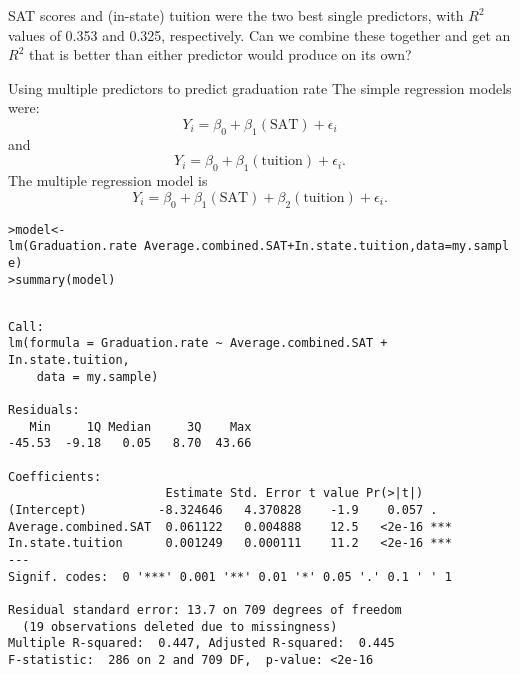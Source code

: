 \documentclass{beamer}\usepackage[]{graphicx}\usepackage[]{color}
\makeatletter
\newcommand{\hlopt}[1]{\textcolor[rgb]{1,0.894,0.769}{#1}}%
\newcommand{\hlstd}[1]{\textcolor[rgb]{1,0.894,0.769}{#1}}%
\newcommand{\hlkwb}[1]{\textcolor[rgb]{0.804,0.776,0.451}{#1}}%
\newcommand{\hlkwc}[1]{\textcolor[rgb]{0.78,0.941,0.545}{#1}}%
\newcommand{\hlkwd}[1]{\textcolor[rgb]{1,0.78,0.769}{#1}}%
\newenvironment{kframe}{%
 \def\at@end@of@kframe{}%
 \ifinner\ifhmode%
  \def\at@end@of@kframe{\end{minipage}}%
  \begin{minipage}{\columnwidth}%
 \fi\fi%
 \def\FrameCommand##1{\hskip\@totalleftmargin \hskip-\fboxsep
 \colorbox{shadecolor}{##1}\hskip-\fboxsep
     \hskip-\linewidth \hskip-\@totalleftmargin \hskip\columnwidth}%
 \MakeFramed {\advance\hsize-\width
   \@totalleftmargin\z@ \linewidth\hsize
   \@setminipage}}%
 {\par\unskip\endMakeFramed%
 \at@end@of@kframe}
\newenvironment{knitrout}{}{} %
\makeatother
\begin{document}
\begin{darkframes}
    \begin{frame}[fragile]

      \begin{center}
        SAT scores and (in-state) tuition were the two best single predictors, with $R^2$ values of 0.353 and 0.325, respectively. Can we combine these together and get an $R^2$ that is better than either predictor would produce on its own?
      \end{center}
    \end{frame}

    \begin{frame}{Using multiple predictors to predict graduation rate}
      The simple regression models were:
      \[
        Y_i = \beta_0 + \beta_1 (\text{SAT}) + \epsilon_i
      \]
      and
      \[
        Y_i = \beta_0 + \beta_1 (\text{tuition}) + \epsilon_i.
      \]
      The multiple regression model is
      \[
        Y_i = \beta_0 + \beta_1 (\text{SAT}) + \beta_2 (\text{tuition}) + \epsilon_i.
      \]
    \end{frame}

    \begin{frame}[fragile]
      \fontsize{8}{8}
\begin{knitrout}
\begin{kframe}
\begin{alltt}
\hlstd{> }\hlstd{model} \hlkwb{<-} \hlkwd{lm}\hlstd{(Graduation.rate} \hlopt{~} \hlstd{Average.combined.SAT} \hlopt{+} \hlstd{In.state.tuition,} \hlkwc{data}\hlstd{=my.sample)}
\hlstd{> }\hlkwd{summary}\hlstd{(model)}
\end{alltt}
\begin{verbatim}

Call:
lm(formula = Graduation.rate ~ Average.combined.SAT + In.state.tuition, 
    data = my.sample)

Residuals:
   Min     1Q Median     3Q    Max 
-45.53  -9.18   0.05   8.70  43.66 

Coefficients:
                      Estimate Std. Error t value Pr(>|t|)    
(Intercept)          -8.324646   4.370828    -1.9    0.057 .  
Average.combined.SAT  0.061122   0.004888    12.5   <2e-16 ***
In.state.tuition      0.001249   0.000111    11.2   <2e-16 ***
---
Signif. codes:  0 '***' 0.001 '**' 0.01 '*' 0.05 '.' 0.1 ' ' 1

Residual standard error: 13.7 on 709 degrees of freedom
  (19 observations deleted due to missingness)
Multiple R-squared:  0.447,	Adjusted R-squared:  0.445 
F-statistic:  286 on 2 and 709 DF,  p-value: <2e-16
\end{verbatim}
\end{kframe}
\end{knitrout}
    \end{frame}


\end{darkframes}
\end{document}

